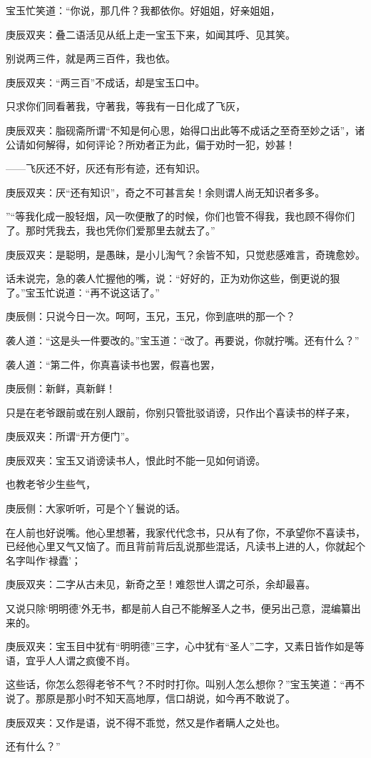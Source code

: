 \begin{parag}
    宝玉忙笑道：“你说，那几件？我都依你。好姐姐，好亲姐姐，\begin{note}庚辰双夹：叠二语活见从纸上走一宝玉下来，如闻其呼、见其笑。\end{note}别说两三件，就是两三百件，我也依。\begin{note}庚辰双夹：“两三百”不成话，却是宝玉口中。\end{note}只求你们同看著我，守著我，等我有一日化成了飞灰，\begin{note}庚辰双夹：脂砚斋所谓“不知是何心思，始得口出此等不成话之至奇至妙之话”，诸公请如何解得，如何评论？所劝者正为此，偏于劝时一犯，妙甚！\end{note}——飞灰还不好，灰还有形有迹，还有知识。\begin{note}庚辰双夹：厌“还有知识”，奇之不可甚言矣！余则谓人尚无知识者多多。\end{note}”“等我化成一股轻烟，风一吹便散了的时候，你们也管不得我，我也顾不得你们了。那时凭我去，我也凭你们爱那里去就去了。”\begin{note}庚辰双夹：是聪明，是愚昧，是小儿淘气？余皆不知，只觉悲感难言，奇瑰愈妙。\end{note}话未说完，急的袭人忙握他的嘴，说：“好好的，正为劝你这些，倒更说的狠了。”宝玉忙说道：“再不说这话了。”\begin{note}庚辰侧：只说今日一次。呵呵，玉兄，玉兄，你到底哄的那一个？\end{note}袭人道：“这是头一件要改的。”宝玉道：“改了。再要说，你就拧嘴。还有什么？”
\end{parag}


\begin{parag}
    袭人道：“第二件，你真喜读书也罢，假喜也罢，\begin{note}庚辰侧：新鲜，真新鲜！\end{note}只是在老爷跟前或在别人跟前，你别只管批驳诮谤，只作出个喜读书的样子来，\begin{note}庚辰双夹：所谓“开方便门”。\end{note}\begin{note}庚辰双夹：宝玉又诮谤读书人，恨此时不能一见如何诮谤。\end{note}也教老爷少生些气，\begin{note}庚辰侧：大家听听，可是个丫鬟说的话。\end{note}在人前也好说嘴。他心里想著，我家代代念书，只从有了你，不承望你不喜读书，已经他心里又气又恼了。而且背前背后乱说那些混话，凡读书上进的人，你就起个名字叫作‘禄蠹’；\begin{note}庚辰双夹：二字从古未见，新奇之至！难怨世人谓之可杀，余却最喜。\end{note}又说只除‘明明德’外无书，都是前人自己不能解圣人之书，便另出己意，混编纂出来的。\begin{note}庚辰双夹：宝玉目中犹有“明明德”三字，心中犹有“圣人”二字，又素日皆作如是等语，宜乎人人谓之疯傻不肖。\end{note}这些话，你怎么怨得老爷不气？不时时打你。叫别人怎么想你？”宝玉笑道：“再不说了。那原是那小时不知天高地厚，信口胡说，如今再不敢说了。\begin{note}庚辰双夹：又作是语，说不得不乖觉，然又是作者瞒人之处也。\end{note}还有什么？”
\end{parag}


